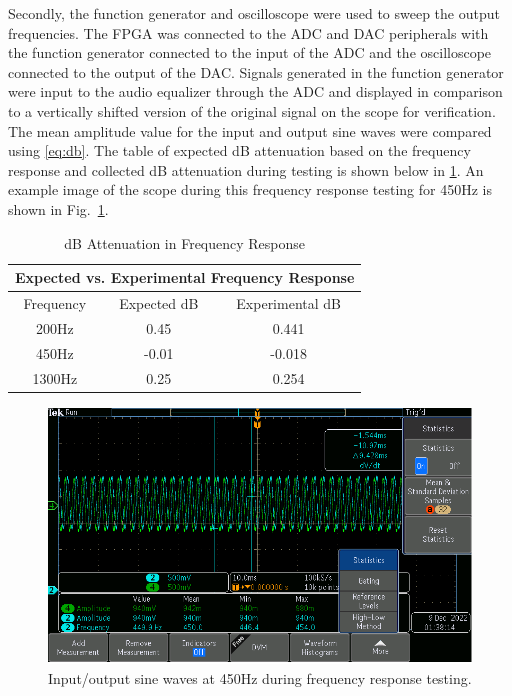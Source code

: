 \documentclass[journal]{IEEEtran} %
\begin{document}
Secondly, the function generator and oscilloscope were used to sweep the output frequencies. The FPGA was connected to the ADC and DAC peripherals with the function generator connected to the input of the ADC and the oscilloscope connected to the output of the DAC. Signals generated in the function generator were input to the audio equalizer through the ADC and displayed in comparison to a vertically shifted version of the original signal on the scope for verification. The mean amplitude value for the input and output sine waves were compared using \eqref{eq:db}. The table of expected dB attenuation based on the frequency response and collected dB attenuation during testing is shown below in \ref{tbl:attenuation}. An example image of the scope during this frequency response testing for 450Hz is shown in Fig.~\ref{fig:450_freq_resp}.

\begin{table}[htbp]
\caption{dB Attenuation in Frequency Response}
\begin{center}
\begin{tabular}{|c|c|c|}
\hline
\multicolumn{3}{|c|}{\textbf{Expected vs. Experimental Frequency Response}}\\
\hline
Frequency & Expected dB & Experimental dB\\
\hline
200Hz & 0.45 & 0.441\\
\hline
450Hz & -0.01 & -0.018\\
\hline
1300Hz & 0.25 & 0.254\\
\hline
\end{tabular}
\label{tbl:attenuation}
\end{center}
\end{table}

\begin{figure}[htbp]
\centering
\includegraphics[width=0.9\linewidth]{Figures/EQ/450 Trough.PNG}
\caption{\label{fig:450_freq_resp}Input/output sine waves at 450Hz during frequency response testing.}
\end{figure}
\end{document}

